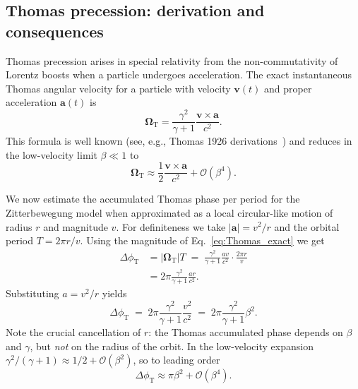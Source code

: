 \documentclass[%
 reprint,
 amsmath,amssymb,
 aps,
]{revtex4-1}
\numberwithin{equation}{section}%
\begin{document}
\subsection{Thomas precession: derivation and consequences}

Thomas precession arises in special relativity from the non-commutativity of Lorentz boosts when a particle undergoes acceleration. The exact instantaneous Thomas angular velocity for a particle with velocity $\mathbf{v}(t)$ and proper acceleration $\mathbf{a}(t)$ is
\begin{equation}
\boldsymbol{\Omega}_{\mathrm{T}} = \frac{\gamma^{2}}{\gamma+1}\frac{\mathbf{v}\times\mathbf{a}}{c^{2}}.
\label{eq:Thomas_exact}
\end{equation}
This formula is well known (see, e.g., Thomas 1926 derivations~\cite{thomas1926}) and reduces in the low-velocity limit $\beta\ll1$ to
\begin{equation}
\boldsymbol{\Omega}_{\mathrm{T}}\approx \frac{1}{2}\frac{\mathbf{v}\times\mathbf{a}}{c^{2}}+\mathcal{O}(\beta^{4}).
\label{eq:Thomas_low}
\end{equation}

We now estimate the accumulated Thomas phase per period for the Zitterbewegung model when approximated as a local circular-like motion of radius $r$ and magnitude $v$. For definiteness we take $|\mathbf{a}|=v^{2}/r$ and the orbital period $T=2\pi r/v$. Using the magnitude of Eq.~\eqref{eq:Thomas_exact} we get
\begin{align}
\Delta\phi_{\mathrm{T}} &= \left|\boldsymbol{\Omega}_{\mathrm{T}}\right| T
\;=\; \frac{\gamma^{2}}{\gamma+1}\frac{a v}{c^{2}}\cdot\frac{2\pi r}{v}
\nonumber\\
&= 2\pi\frac{\gamma^{2}}{\gamma+1}\frac{a r}{c^{2}}.
\label{eq:DeltaPhiT_general}
\end{align}
Substituting $a=v^{2}/r$ yields
\begin{equation}
\Delta\phi_{\mathrm{T}} \;=\; 2\pi\frac{\gamma^{2}}{\gamma+1}\frac{v^{2}}{c^{2}}
\;=\; 2\pi\frac{\gamma^{2}}{\gamma+1}\beta^{2}.
\label{eq:DeltaPhiT_simplified}
\end{equation}
Note the crucial cancellation of $r$: the Thomas accumulated phase depends on $\beta$ and $\gamma$, but \emph{not} on the radius of the orbit. In the low-velocity expansion $\gamma^{2}/(\gamma+1)\approx 1/2+\mathcal{O}(\beta^{2})$, so to leading order
\begin{equation}
\Delta\phi_{\mathrm{T}}\approx \pi\beta^{2} + \mathcal{O}(\beta^{4}).
\label{eq:DeltaPhiT_lowbeta}
\end{equation}
\end{document}
